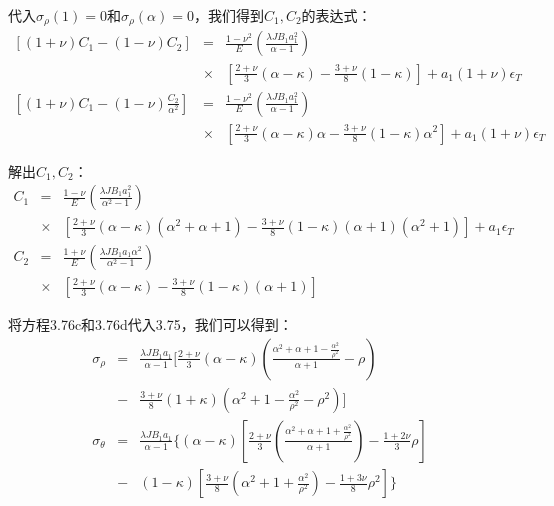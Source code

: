 代入$\sigma_{\rho}(1)=0$和$\sigma_{\rho}(\alpha)=0$，我们得到$C_1,C_2$的表达式：
\begin{eqnarray}
{[(1+\nu)C_1-(1-\nu)C_2]}&=&\frac{1-\nu^2}{E}(\frac{\lambda JB_1a_1^2}{\alpha-1})  \\ \nonumber
&\times&\left[\frac{2+\nu}{3}(\alpha-\kappa)-\frac{3+\nu}{8}(1-\kappa)\right]+a_1(1+\nu)\epsilon_T\\
{[(1+\nu)C_1-(1-\nu)\frac{C_2}{\alpha^2}]}&=&\frac{1-\nu^2}{E}(\frac{\lambda JB_1a_1^2}{\alpha-1})  \\ \nonumber
&\times&\left[\frac{2+\nu}{3}(\alpha-\kappa)\alpha-\frac{3+\nu}{8}(1-\kappa)\alpha^2\right] +a_1(1+\nu)\epsilon_T %
\end{eqnarray}

解出$C_1,C_2$：
\begin{eqnarray}
C_1&=&\frac{1-\nu}{E}(\frac{\lambda JB_1a_1^2}{\alpha^2-1}) \\ \nonumber
&\times&\left[\frac{2+\nu}{3}(\alpha-\kappa)(\alpha^2+\alpha+1)-\frac{3+\nu}{8}(1-\kappa)(\alpha+1)(\alpha^2+1)\right] +a_1\epsilon_T\\
C_2&=&\frac{1+\nu}{E}(\frac{\lambda JB_1a_1\alpha^2}{\alpha^2-1})\\ \nonumber
&\times &\left[\frac{2+\nu}{3}(\alpha-\kappa)-\frac{3+\nu}{8}(1-\kappa)(\alpha+1)\right]
\end{eqnarray}

将方程3.76c和3.76d代入3.75，我们可以得到：
\begin{eqnarray}
\sigma_\rho&=&\frac{\lambda JB_1a_1}{\alpha-1}[\frac{2+\nu}{3}(\alpha-\kappa)(\frac{\alpha^2+\alpha+1-\frac{\alpha^2}{\rho^2}}{\alpha+1}-\rho) \\ \nonumber
&-&\frac{3+\nu}{8}(1+\kappa)(\alpha^2+1-\frac{\alpha^2}{\rho^2}-\rho^2)]\\
\sigma_\theta&=&\frac{\lambda JB_1a_1}{\alpha-1}\{(\alpha-\kappa)[\frac{2+\nu}{3}(\frac{\alpha^2+\alpha+1+{\frac{\alpha^2}{\rho^2}}}{\alpha+1})-\frac{1+2\nu}{3}\rho] \\ \nonumber
&-&(1-\kappa)[\frac{3+\nu}{8}(\alpha^2+1+\frac{\alpha^2}{\rho^2})-\frac{1+3\nu}{8}\rho^2]\}
\end{eqnarray}

